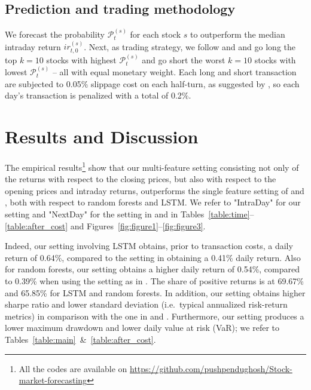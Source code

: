 \documentclass[review]{elsarticle}
\begin{document}
\subsection{Prediction and trading methodology}
We forecast the probability $\mathcal{P}^{(s)}_{t}$ for each stock $s$ to outperform the median intraday return $ir^{(s)}_{t,0}$. Next, as trading strategy, we follow \cite{krauss17} and \cite{krauss18}
and go long the top $k=10$ stocks with highest $\mathcal{P}^{(s)}_{t}$ and go short 
the worst $k=10$ stocks with lowest $\mathcal{P}^{(s)}_{t}$ -- all with equal monetary weight.  Each long and short transaction are subjected to 0.05$\%$ slippage cost on each half-turn, as suggested by \cite{avellaneda2010statistical}, so each day's transaction is penalized with a total of 0.2$\%$. 



\section{Results and Discussion}\label{sec:result}




    
    







The empirical results\footnote{All the codes are available on \url{https://github.com/pushpendughosh/Stock-market-forecasting}} 
show that our multi-feature setting consisting not only of the returns with respect to the closing prices, but also with respect to the opening prices and intraday returns, outperforms the single feature setting of \cite{krauss17} and \cite{krauss18}, both with respect to random forests and LSTM. We refer to  "IntraDay" for our setting and "NextDay" for the setting in \cite{krauss17} and \cite{krauss18} in Tables~\ref{table:time}--\ref{table:after_cost} and Figures~\ref{fig:figure1}--\ref{fig:figure3}.

Indeed, our setting involving LSTM obtains, prior to transaction costs, a daily return of 0.64\%, compared to the setting in \cite{krauss18} obtaining a 0.41\% daily return. Also for random forests, our setting obtains a higher daily return of 0.54\%, compared to 0.39\% when using the setting as in \cite{krauss17}. The share of positive returns is at 69.67\% and 65.85\%  for LSTM and random forests. In addition,
our setting obtains 
higher sharpe ratio and lower standard deviation (i.e.\ typical annualized risk-return metrics) in comparison with the one in \cite{krauss17} and \cite{krauss18}. Furthermore, our setting produces a lower maximum drawdown and lower daily value at risk (VaR); we refer to Tables~\ref{table:main}~\&~\ref{table:after_cost}. 
\end{document}
